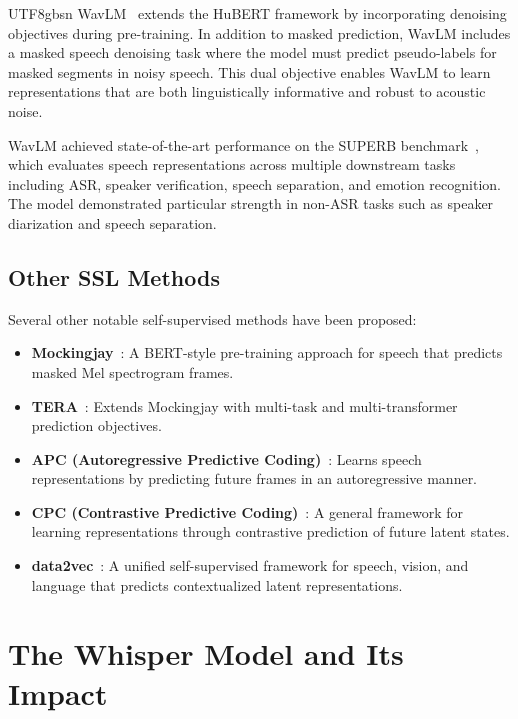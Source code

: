 \documentclass[12pt,a4paper]{article}
\begin{document}
\begin{CJK}{UTF8}{gbsn}
WavLM~\cite{chen2022wavlm} extends the HuBERT framework by incorporating denoising objectives during pre-training. In addition to masked prediction, WavLM includes a masked speech denoising task where the model must predict pseudo-labels for masked segments in noisy speech. This dual objective enables WavLM to learn representations that are both linguistically informative and robust to acoustic noise.

WavLM achieved state-of-the-art performance on the SUPERB benchmark~\cite{yang2021superb}, which evaluates speech representations across multiple downstream tasks including ASR, speaker verification, speech separation, and emotion recognition. The model demonstrated particular strength in non-ASR tasks such as speaker diarization and speech separation.

\subsection{Other SSL Methods}
\label{subsec:other_ssl}

Several other notable self-supervised methods have been proposed:

\begin{itemize}[leftmargin=*]
    \item \textbf{Mockingjay}~\cite{liu2020mockingjay}: A BERT-style pre-training approach for speech that predicts masked Mel spectrogram frames.
    \item \textbf{TERA}~\cite{liu2021tera}: Extends Mockingjay with multi-task and multi-transformer prediction objectives.
    \item \textbf{APC (Autoregressive Predictive Coding)}~\cite{chung2019unsupervised}: Learns speech representations by predicting future frames in an autoregressive manner.
    \item \textbf{CPC (Contrastive Predictive Coding)}~\cite{oord2018representation}: A general framework for learning representations through contrastive prediction of future latent states.
    \item \textbf{data2vec}~\cite{baevski2022data2vec}: A unified self-supervised framework for speech, vision, and language that predicts contextualized latent representations.
\end{itemize}

\section{The Whisper Model and Its Impact}
\label{sec:whisper}


\end{CJK}
\end{document}
